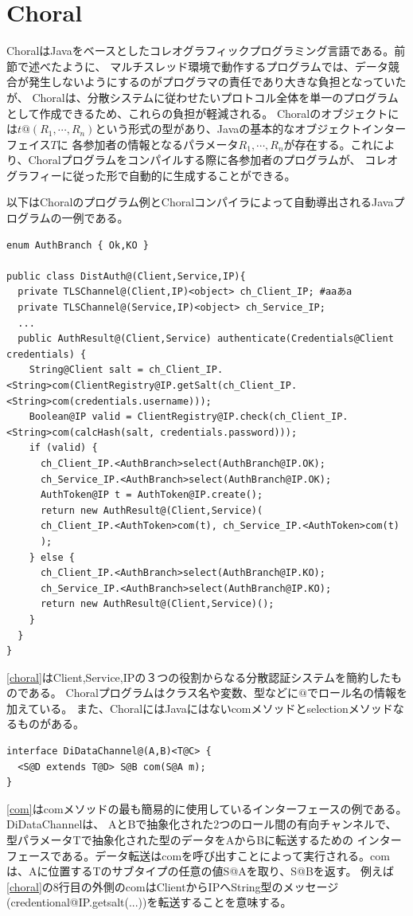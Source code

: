 \documentclass{thesis}
\begin{document}
\section{Choral}
ChoralはJavaをベースとしたコレオグラフィックプログラミング言語である。前節で述べたように、
マルチスレッド環境で動作するプログラムでは、データ競合が発生しないようにするのがプログラマの責任であり大きな負担となっていたが、
Choralは、分散システムに従わせたいプロトコル全体を単一のプログラムとして作成できるため、これらの負担が軽減される。
Choralのオブジェクトには$t@(R_1,\cdots,R_n)$という形式の型があり、Javaの基本的なオブジェクトインターフェイス$T$に
各参加者の情報となるパラメータ$R_1,\cdots,R_n$が存在する。これにより、Choralプログラムをコンパイルする際に各参加者のプログラムが、
コレオグラフィーに従った形で自動的に生成することができる。

以下はChoralのプログラム例とChoralコンパイラによって自動導出されるJavaプログラムの一例である。
\begin{lstlisting}[caption=Choralプログラムの例(分散認証),label=choral]
enum AuthBranch { Ok,KO }

public class DistAuth@(Client,Service,IP){
  private TLSChannel@(Client,IP)<object> ch_Client_IP; #aaあa
  private TLSChannel@(Service,IP)<object> ch_Service_IP;
  ...
  public AuthResult@(Client,Service) authenticate(Credentials@Client credentials) {
    String@Client salt = ch_Client_IP.<String>com(ClientRegistry@IP.getSalt(ch_Client_IP.<String>com(credentials.username)));
    Boolean@IP valid = ClientRegistry@IP.check(ch_Client_IP.<String>com(calcHash(salt, credentials.password)));
    if (valid) {
      ch_Client_IP.<AuthBranch>select(AuthBranch@IP.OK);
      ch_Service_IP.<AuthBranch>select(AuthBranch@IP.OK);
      AuthToken@IP t = AuthToken@IP.create();
      return new AuthResult@(Client,Service)(
      ch_Client_IP.<AuthToken>com(t), ch_Service_IP.<AuthToken>com(t)
      );
    } else {
      ch_Client_IP.<AuthBranch>select(AuthBranch@IP.KO);
      ch_Service_IP.<AuthBranch>select(AuthBranch@IP.KO);
      return new AuthResult@(Client,Service)();
    }
  }
}
\end{lstlisting}
\ref{choral}はClient,Service,IPの３つの役割からなる分散認証システムを簡約したものである。
Choralプログラムはクラス名や変数、型などに$@$でロール名の情報を加えている。
また、ChoralにはJavaにはないcomメソッドとselectionメソッドなるものがある。

\begin{lstlisting}[caption=データ転送のための基本的な有向チャンネル,label=com]
interface DiDataChannel@(A,B)<T@C> {
  <S@D extends T@D> S@B com(S@A m);
} 
\end{lstlisting}
\ref{com}はcomメソッドの最も簡易的に使用しているインターフェースの例である。DiDataChannelは、
AとBで抽象化された2つのロール間の有向チャンネルで、型パラメータTで抽象化された型のデータをAからBに転送するための
インターフェースである。データ転送はcomを呼び出すことによって実行される。comは、Aに位置するTのサブタイプの任意の値S@Aを取り、S@Bを返す。
例えば\ref{choral}の8行目の外側のcomはClientからIPへString型のメッセージ(credentional@IP.getsalt(...))を転送することを意味する。
\end{document}
